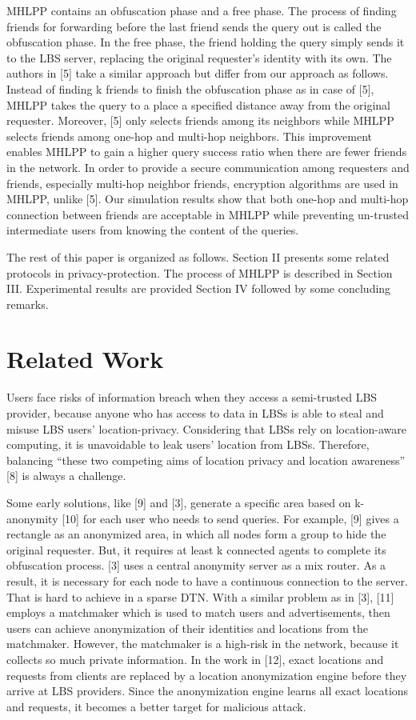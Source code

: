 \documentclass[conference]{IEEEtran}
\begin{document}
MHLPP contains an obfuscation phase and a free phase. The process of finding friends for forwarding before the last friend sends the query out is called the obfuscation phase. In the free phase, the friend holding the query simply sends it to the LBS server, replacing the original requester’s identity with its own. The authors in [5] take a similar approach but differ from our approach as follows. Instead of finding k friends to finish the obfuscation phase as in case of [5], MHLPP takes the query to a place a specified distance away from the original requester. Moreover, [5] only selects friends among its neighbors while MHLPP selects friends among one-hop and multi-hop neighbors. This improvement enables MHLPP to gain a higher query success ratio when there are fewer friends in the network. In order to provide a secure communication among requesters and friends, especially multi-hop neighbor friends, encryption algorithms are used in MHLPP, unlike [5]. Our simulation results show that both one-hop and multi-hop connection between friends are acceptable in MHLPP while preventing un-trusted intermediate users from knowing the content of the queries.

The rest of this paper is organized as follows. Section II presents some related protocols in privacy-protection. The process of MHLPP is described in Section III. Experimental results are provided Section IV followed by some concluding remarks.

\section{Related Work}

Users face risks of information breach when they access a semi-trusted LBS provider, because anyone who has access to data in LBSs is able to steal and misuse LBS users’ location-privacy. Considering that  LBSs rely on location-aware computing, it is unavoidable to leak users' location from LBSs. Therefore, balancing “these two competing aims of location privacy and location awareness” [8] is always a challenge.

Some early solutions, like [9] and [3], generate a specific area based on k-anonymity [10] for each user who needs to send queries. For example, [9] gives a rectangle as an anonymized area, in which all nodes form a group to hide the original requester. But, it requires at least k connected agents to complete its obfuscation process. [3] uses a central anonymity server as a mix router. As a result, it is necessary for each node to have a continuous connection to the server. That is hard to achieve in a sparse DTN. With a similar problem as in [3], [11] employs a matchmaker which is used to match users and advertisements, then users can achieve anonymization of their identities and locations from the matchmaker. However, the matchmaker is a high-risk in the network, because it collects so much private information. In the work in [12], exact locations and requests from clients are replaced by a location anonymization engine before they arrive at LBS providers. Since the anonymization engine learns all exact locations and requests, it becomes a better target for malicious attack.
\end{document}
